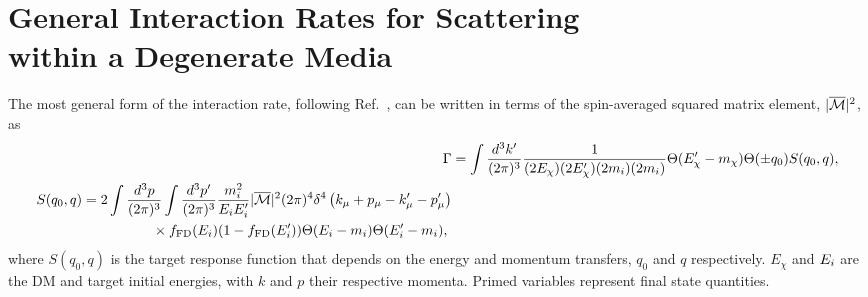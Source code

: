 \section[General Interaction Rates for Scattering within a Degenerate Media]{General Interaction Rates for Scattering\\within a Degenerate Media}
\label{app:sec:genral_int_rate}

The most general form of the interaction rate, following Ref.~\cite{Bertoni:2013bsa_dec_DarkMatterThermalization}, can be written in terms of the spin-averaged squared matrix element, $|\overline{\mathcal M}|^2$, as
\begin{align}
    \Gamma &= \int\frac{d^3 k'}{(2\pi)^3}\frac{1}{(2E_\chi)(2E_\chi')(2m_i)(2m_i)}\Theta(E_\chi' - m_\chi)\Theta(\pm q_0)S(q_0, q),\\
    \begin{split}
        S(q_0, q) & = 2\int\frac{d^3 p}{(2\pi)^3}\int\frac{d^3 p'}{(2\pi)^3}\frac{m_i^2}{E_i E_i'}|\overline{\mathcal M}|^2(2\pi)^4\delta^4\left( k_\mu + p_\mu - k_\mu' - p_\mu'\right)\\
        &\hspace{5em}\times f_{\rm FD}(E_i)(1 - f_{\rm FD}(E_i'))\Theta(E_i - m_i)\Theta(E_i' - m_i),\label{app:eq:full_response_S}
    \end{split}
\end{align}
where $S(q_0, q)$ is the target response function that depends on the energy and momentum transfers, $q_0$ and $q$ respectively.  $E_\chi$ and $E_i$ are the DM and target initial energies, with $k$ and $p$ their respective momenta. Primed variables represent final state quantities.  

